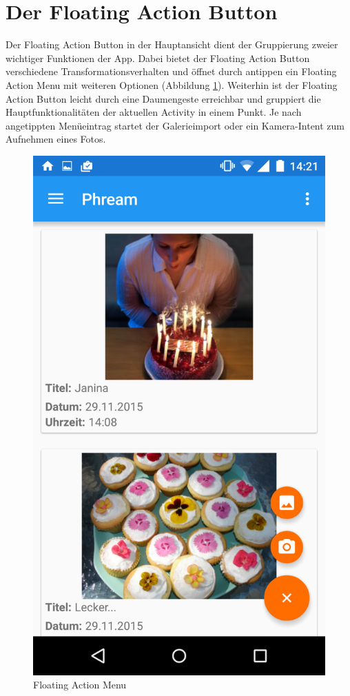 \section{Der Floating Action Button}
Der Floating Action Button in der Hauptansicht dient der Gruppierung zweier wichtiger Funktionen der App. Dabei bietet der Floating Action Button verschiedene Transformationsverhalten und öffnet durch antippen ein Floating Action Menu mit weiteren Optionen (Abbildung \ref{label:floatingaction_menu}). Weiterhin ist der Floating Action Button leicht durch eine Daumengeste erreichbar und gruppiert die Hauptfunktionalitäten der aktuellen Activity in einem Punkt. Je nach angetippten Menüeintrag startet der Galerieimport oder ein Kamera-Intent zum Aufnehmen eines Fotos.

\begin{figure}[H]
\centering
\includegraphics[scale=0.1]{images/screenshots/floatingaction_menu.png}
\caption{Floating Action Menu}
\label{label:floatingaction_menu}
\end{figure}

